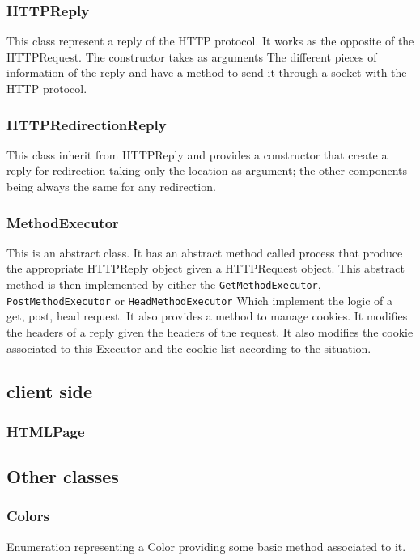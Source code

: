 \documentclass[11pt]{article}
\begin{document}
\subsubsection{HTTPReply}
This class represent a reply of the HTTP protocol. It works as the opposite of the HTTPRequest. The constructor takes as arguments The different pieces of information of the reply and have a method to send it through a socket with the HTTP protocol.

\subsubsection{HTTPRedirectionReply}
This class inherit from HTTPReply and provides a constructor that create a reply for redirection taking only the location as argument; the other components being always the same for any redirection.

\subsubsection{MethodExecutor}
This is an abstract class. It has an abstract method called process that produce the appropriate HTTPReply object given a HTTPRequest object. This abstract method is then implemented by either the \texttt{GetMethodExecutor}, \texttt{PostMethodExecutor} or \texttt{HeadMethodExecutor} Which implement the logic of a get, post, head request. It also provides a method to manage cookies. It modifies the headers of a reply given the headers of the request. It also modifies the cookie associated to this Executor and the cookie list according to the situation.

\subsection{client side}
\subsubsection{HTMLPage}

\subsection{Other classes}

\subsubsection{Colors}
Enumeration representing a Color providing some basic method associated to it.
\end{document}

